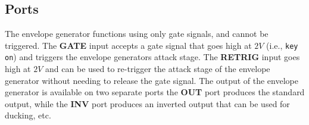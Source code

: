 \documentclass[12pt,letter]{article}
\begin{document}
\subsection{Ports}

The envelope generator functions using only gate signals, and cannot be triggered. The \textbf{GATE} input accepts a gate signal that goes high at $2V$ (i.e., \texttt{key on}) and triggers the envelope generators attack stage. The \textbf{RETRIG} input goes high at $2V$ and can be used to re-trigger the attack stage of the envelope generator without needing to release the gate signal. The output of the envelope generator is available on two separate ports the \textbf{OUT} port produces the standard output, while the \textbf{INV} port produces an inverted output that can be used for ducking, etc.
\end{document}
